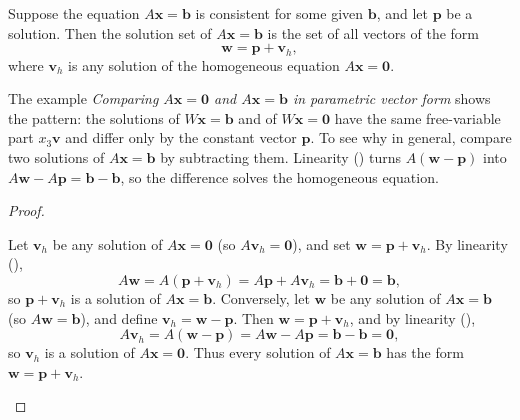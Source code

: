 \documentclass[10pt]{scrartcl}
\newcommand{\vv}[1]{\mathbf{#1}}
\begin{document}
\begin{theorem*}[Lay 1.5 Thm.~6: Solution set of $A\vv x=\vv b$ is a translate of the solution set of $A\vv x=\vv 0$]
  Suppose the equation $A\vv x=\vv b$ is consistent for some given $\vv b$, and let $\vv p$ be a solution. Then the solution set of $A\vv x=\vv b$ is the set of all vectors of the form
  \[
    \vv w = \vv p + \vv v_h,
  \]
  where $\vv v_h$ is any solution of the homogeneous equation $A\vv x=\vv 0$.
\end{theorem*}
\begin{ideabox}
  The example \emph{Comparing $A\vv x=\vv 0$ and $A\vv x=\vv b$ in parametric vector form} shows the pattern: the solutions of $W\vv x=\vv b$ and of $W\vv x=\vv 0$ have the same free-variable part $x_3\vv v$ and differ only by the constant vector $\vv p$. To see why in general, compare two solutions of $A\vv x=\vv b$ by subtracting them. Linearity () turns $A(\vv w-\vv p)$ into $A\vv w-A\vv p=\vv b-\vv b$, so the difference solves the homogeneous equation.
\end{ideabox}
\begin{proof}
  \begin{steps}
    \ii Let $\vv v_h$ be any solution of $A\vv x=\vv 0$ (so $A\vv v_h=\vv 0$), and set $\vv w=\vv p+\vv v_h$. By linearity (),
    \[
      A\vv w = A(\vv p+\vv v_h) = A\vv p + A\vv v_h = \vv b + \vv 0 = \vv b,
    \]
    so $\vv p+\vv v_h$ is a solution of $A\vv x=\vv b$.
    \ii Conversely, let $\vv w$ be any solution of $A\vv x=\vv b$ (so $A\vv w=\vv b$), and define $\vv v_h=\vv w-\vv p$. Then $\vv w=\vv p+\vv v_h$, and by linearity (),
    \[
      A\vv v_h = A(\vv w-\vv p) = A\vv w - A\vv p = \vv b - \vv b = \vv 0,
    \]
    so $\vv v_h$ is a solution of $A\vv x=\vv 0$. Thus every solution of $A\vv x=\vv b$ has the form $\vv w=\vv p+\vv v_h$.
  \end{steps}
\end{proof}
\end{document}
